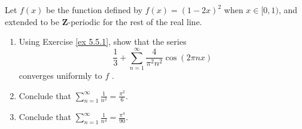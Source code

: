 \begin{exercise}\label{ex 5.5.2}
    Let \(f(x)\) be the function defined by \(f(x) = (1 - 2x)^2\) when \(x \in [0, 1)\), and extended to be \(\mathbf{Z}\)-periodic for the rest of the real line.
    \begin{enumerate}
        \item Using Exercise \ref{ex 5.5.1}, show that the series
              \[
                  \frac{1}{3} + \sum_{n = 1}^\infty \frac{4}{\pi^2 n^2} \cos(2 \pi n x)
              \]
              converges uniformly to \(f\) .
        \item Conclude that \(\sum_{n = 1}^\infty \frac{1}{n^2} = \frac{\pi^2}{6}\).
        \item Conclude that \(\sum_{n = 1}^\infty \frac{1}{n^4} = \frac{\pi^4}{90}\).
    \end{enumerate}
\end{exercise}

